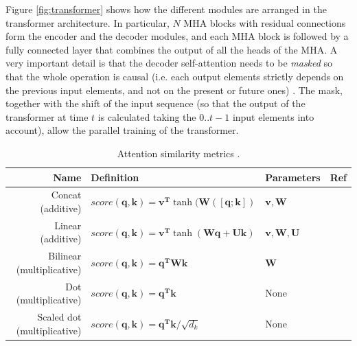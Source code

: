  

Figure \ref{fig:transformer} shows how the different modules are arranged in the transformer architecture. In particular, $N$ MHA blocks with residual connections form the encoder and the decoder modules, and each MHA block is followed by a fully connected layer that combines the output of all the heads of the MHA. A very important detail is that the decoder self-attention needs to be \textit{masked} so that the whole operation is causal (i.e. each output elements strictly depends on the previous input elements, and not on the present or future ones) \cite{vaswani2017}. The mask, together with the shift of the input sequence (so that the output of the transformer at time $t$ is calculated taking the $0..t-1$ input elements into account), allow the parallel training of the transformer.


\begin{table}
\caption{Attention similarity metrics \cite{uday2019}.}
\footnotesize
\centering
\begin{tabular}{r|lll}
	\toprule
	            Name             &                                           Definition                                            &              Parameters              &         Ref         \\ \midrule
	     Concat (additive)       &     $score(\mathbf{q}, \mathbf{k}) = \mathbf{v^T} \tanh(\mathbf{W}([\mathbf{q};\mathbf{k}])$      &       $\mathbf{v}, \mathbf{W}$       &  \cite{Luong2015}   \\ 
	     Linear (additive)       & $score(\mathbf{q}, \mathbf{k}) = \mathbf{v^T} \tanh(\mathbf{W}\mathbf{q} + \mathbf{U}\mathbf{k})$ & $\mathbf{v}, \mathbf{W}, \mathbf{U}$ & \cite{bahdanau2014} \\ 
	 Bilinear (multiplicative)   &              $score(\mathbf{q}, \mathbf{k}) =  \mathbf{q^T} \mathbf{W} \mathbf{k}$              &             $\mathbf{W}$             &  \cite{Luong2015}   \\ 
	   Dot  (multiplicative)     &                   $score(\mathbf{q}, \mathbf{k}) = \mathbf{q^T}  \mathbf{k}$                    &                 None                 & \cite{vaswani2017}  \\ 
	Scaled dot  (multiplicative) &             $score(\mathbf{q}, \mathbf{k}) =  \mathbf{q^T} \mathbf{k} / \sqrt{d_k}$             &                 None                 &  \cite{Luong2015}   \\ \bottomrule
\end{tabular}
\label{table:attentionsimilarities}
\end{table}

